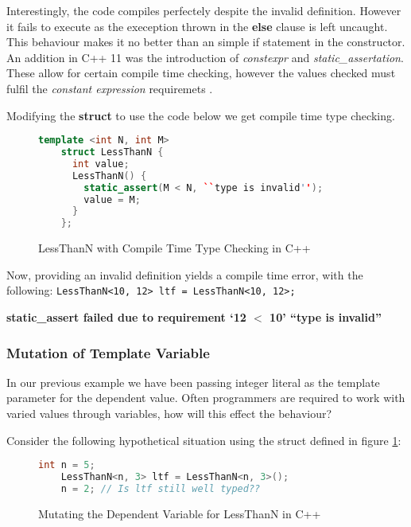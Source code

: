 \documentclass[a4paper,12pt]{report}
\begin{document}
\par
Interestingly, the code compiles perfectely despite the invalid definition. 
However it fails to execute as the exeception thrown in the \textbf{else} clause 
is left uncaught. This behaviour makes it no better than an simple if statement 
in the constructor. An addition in C++ 11 was the introduction of 
\textit{constexpr} and \textit{static\_assertation}. These allow for certain 
compile time checking, however the values checked must fulfil 
the \textit{constant expression} requiremets \cite{cppConstExpr}. 

\par
Modifying the \textbf{struct} to use the code below we get compile time type 
checking. 

\begin{figure}[H]
  \begin{lstlisting}[language=c++]     
    template <int N, int M>
    struct LessThanN {
      int value;
      LessThanN() {
        static_assert(M < N, ``type is invalid'');
        value = M;
      }
    };
  \end{lstlisting}
  \caption{LessThanN with Compile Time Type Checking in C++}
  \label{code:compileLTN}
\end{figure}

\par
Now, providing an invalid definition yields a compile time error, with the 
following: 
\verb+LessThanN<10, 12> ltf = LessThanN<10, 12>;+ 

\textbf{static\_assert failed due to requirement `12 $<$ 10' ``type is invalid''}

\subsubsection{Mutation of Template Variable}
In our previous example we have been passing integer literal as the template 
parameter for the dependent value. Often programmers are required to 
work with varied values through variables, how will this effect the behaviour? 

\par
Consider the following hypothetical situation using the struct defined in 
figure \ref{code:compileLTN}: 

\begin{figure}[H]
  \begin{lstlisting}[language=c++]     
    int n = 5;
    LessThanN<n, 3> ltf = LessThanN<n, 3>();
    n = 2; // Is ltf still well typed??
  \end{lstlisting}
  \caption{Mutating the Dependent Variable for LessThanN in C++}
\end{figure}
\end{document}
